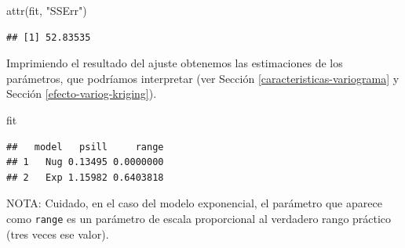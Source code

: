 \documentclass[
  spanish,
]{book}
\newenvironment{Shaded}{\begin{snugshade}}{\end{snugshade}}
\newcommand{\CommentTok}[1]{\textcolor[rgb]{0.56,0.35,0.01}{\textit{#1}}}
\newcommand{\DecValTok}[1]{\textcolor[rgb]{0.00,0.00,0.81}{#1}}
\newcommand{\FunctionTok}[1]{\textcolor[rgb]{0.00,0.00,0.00}{#1}}
\newcommand{\NormalTok}[1]{#1}
\newcommand{\OtherTok}[1]{\textcolor[rgb]{0.56,0.35,0.01}{#1}}
\newcommand{\SpecialCharTok}[1]{\textcolor[rgb]{0.00,0.00,0.00}{#1}}
\newcommand{\StringTok}[1]{\textcolor[rgb]{0.31,0.60,0.02}{#1}}
\theoremstyle{break}
\theoremstyle{definition}
\theoremstyle{definition}
\theoremstyle{definition}
\theoremstyle{definition}
\theoremstyle{remark}
\begin{document}
\begin{Shaded}
\begin{Highlighting}[]
\FunctionTok{attr}\NormalTok{(fit, }\StringTok{"SSErr"}\NormalTok{)}
\end{Highlighting}
\end{Shaded}

\begin{verbatim}
## [1] 52.83535
\end{verbatim}

Imprimiendo el resultado del ajuste obtenemos las estimaciones de los parámetros, que podríamos interpretar (ver Sección \ref{caracteristicas-variograma} y Sección \ref{efecto-variog-kriging}).

\begin{Shaded}
\begin{Highlighting}[]
\NormalTok{fit}
\end{Highlighting}
\end{Shaded}

\begin{verbatim}
##   model   psill     range
## 1   Nug 0.13495 0.0000000
## 2   Exp 1.15982 0.6403818
\end{verbatim}

\begin{Shaded}
\end{Shaded}

NOTA: Cuidado, en el caso del modelo exponencial, el parámetro que aparece como \texttt{range} es un parámetro de escala proporcional al verdadero rango práctico (tres veces ese valor).
\end{document}
